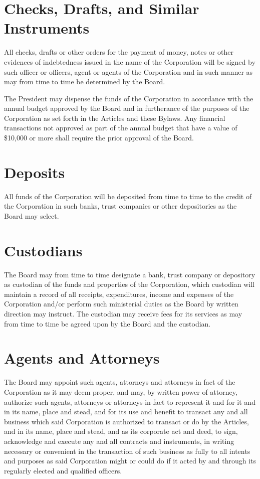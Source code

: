 \documentclass[
]{book}
\begin{document}
\section{Checks, Drafts, and Similar Instruments}\label{checks-drafts-and-similar-instruments}

All checks, drafts or other orders for the payment of money, notes or other evidences of indebtedness issued in the name of the Corporation will be signed by such officer or officers, agent or agents of the Corporation and in such manner as may from time to time be determined by the Board.

The President may dispense the funds of the Corporation in accordance with the annual budget approved by the Board and in furtherance of the purposes of the Corporation as set forth in the Articles and these Bylaws. Any financial transactions not approved as part of the annual budget that have a value of \$10,000 or more shall require the prior approval of the Board.

\section{Deposits}\label{deposits}

All funds of the Corporation will be deposited from time to time to the credit of the Corporation in such banks, trust companies or other depositories as the Board may select.

\section{Custodians}\label{custodians}

The Board may from time to time designate a bank, trust company or depository as custodian of the funds and properties of the Corporation, which custodian will maintain a record of all receipts, expenditures, income and expenses of the Corporation and/or perform such ministerial duties as the Board by written direction may instruct. The custodian may receive fees for its services as may from time to time be agreed upon by the Board and the custodian.

\section{Agents and Attorneys}\label{agents-and-attorneys}

The Board may appoint such agents, attorneys and attorneys in fact of the Corporation as it may deem proper, and may, by written power of attorney, authorize such agents, attorneys or attorneys-in-fact to represent it and for it and in its name, place and stead, and for its use and benefit to transact any and all business which said Corporation is authorized to transact or do by the Articles, and in its name, place and stead, and as its corporate act and deed, to sign, acknowledge and execute any and all contracts and instruments, in writing necessary or convenient in the transaction of such business as fully to all intents and purposes as said Corporation might or could do if it acted by and through its regularly elected and qualified officers.
\end{document}
